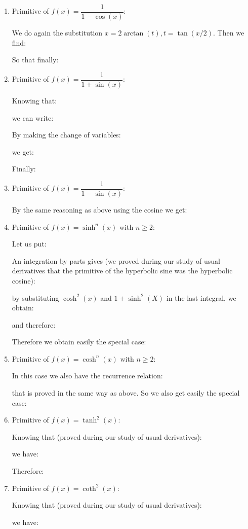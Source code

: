 \begin{enumerate}
		\item  Primitive of $f(x)=\dfrac{1}{1-\cos(x)}$:
		
		We do again the substitution $x=2\arctan(t),t=\tan(x/2)$. Then we find:
		
		So that finally:
		
		\item  Primitive of $f(x)=\dfrac{1}{1+\sin(x)}$:
		
		Knowing that:
		
		we can write:
		
		By making the change of variables:
		
		we get:
		
		Finally:
		
		\item  Primitive of $f(x)=\dfrac{1}{1-\sin(x)}$:
		
		By the same reasoning as above using the cosine we get:
		
		
		\item Primitive of $f(x)=\sinh^n(x)$ with $n \geq 2$:
		
		Let us put:
		
		An integration by parts gives (we proved during our study of usual derivatives that the primitive of the hyperbolic sine was the hyperbolic cosine):
		
		by substituting $\cosh^2(x)$  and $1+\sinh^2(X)$ in the last integral, we obtain:
		
		and therefore:
		
		Therefore we obtain easily the special case:
		 
		\item Primitive of $f(x)=\cosh^n(x)$ with $n \geq 2$:
		
		In this case we also have the recurrence relation:
		
		that is proved in the same way as above. So we also get easily the special case:
		
		
		\item Primitive of $f(x)=\tanh^2(x)$:
		
		Knowing that (proved during our study of usual derivatives):
		
		we have:
		
		Therefore:
		
		
		\item Primitive of $f(x)=\coth^2(x)$:
		
		Knowing that (proved during our study of usual derivatives):
		
		we have:
		

\end{enumerate}
